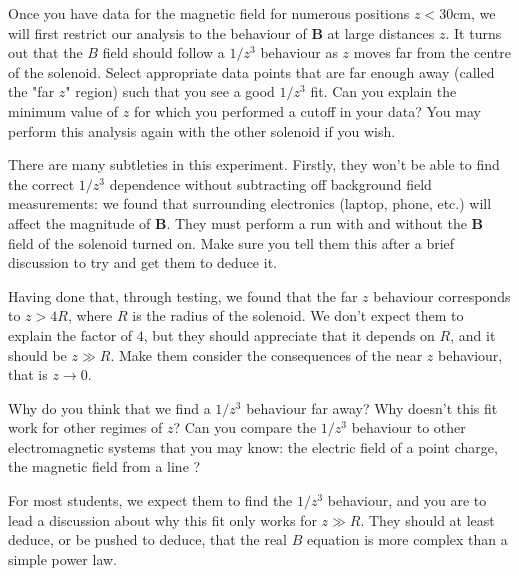 \documentclass[12pt]{report}
\begin{document}
Once you have data for the magnetic field for numerous positions $z<30$cm, we will first restrict our analysis to the behaviour of $\mathbf{B}$ at large distances $z$. It turns out that the $B$ field should follow a $1/z^3$ behaviour as $z$ moves far from the centre of the solenoid. 
{\color{blue}Select appropriate data points that are far enough away (called the "far $z$" region) such that you see a good $1/z^3$ fit. Can you explain the minimum value of $z$ for which you performed a cutoff in your data?} You may perform this analysis again with the other solenoid if you wish.



\begin{tcolorbox}
There are many subtleties in this experiment. Firstly, they won't be able to find the correct $1/z^3$ dependence without subtracting off background field measurements: we found that surrounding electronics (laptop, phone, etc.) will affect the magnitude of $\mathbf{B}$. They must perform a run with and without the $\mathbf{B}$ field of the solenoid turned on. Make sure you tell them this after a brief discussion to try and get them to deduce it.
\end{tcolorbox}
\begin{tcolorbox}
Having done that, through testing, we found that the far $z$ behaviour corresponds to $z>4R$, where $R$ is the radius of the solenoid. We don't expect them to explain the factor of $4$, but they should appreciate  that it depends on $R$, and it should be $z \gg R$. Make them consider the consequences of the near $z$ behaviour, that is $z \rightarrow 0$.
\end{tcolorbox}


{\color{blue} Why do you think that we find a $1/z^3$ behaviour far away?
Why doesn't this fit work for other regimes of $z$?
Can you compare the $1/z^3$ behaviour to other electromagnetic systems that you may know: the electric field of a point charge, the magnetic field from a line
?}
\begin{tcolorbox}
For most students, we expect them to find the $1/z^3$ behaviour, and you are to lead a discussion about why this fit only works for $z\gg R$. They should at least deduce, or be pushed to deduce, that the real $B$ equation is more complex than a simple power law.
\end{tcolorbox}
\end{document}
